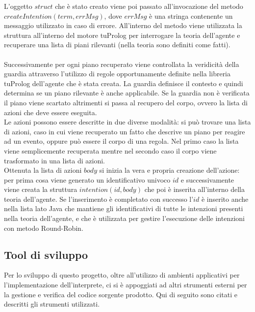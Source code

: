 L'oggetto $struct$ che è stato creato viene poi passato all'invocazione del metodo $createIntention(term, errMsg)$, dove $errMsg$ è una stringa contenente un messaggio utilizzato in caso di errore.
All'interno del metodo viene utilizzata la struttura all'interno del motore tuProlog per interrogare la teoria dell'agente e recuperare una lista di piani rilevanti (nella teoria sono definiti come fatti). \\
\\
Successivamente per ogni piano recuperato viene controllata la veridicità della guardia attraverso l'utilizzo di regole opportunamente definite nella libreria tuProlog dell'agente che è stata creata. La guardia definisce il contesto e quindi determina se un piano rilevante è anche applicabile.
Se la guardia non è verificata il piano viene scartato altrimenti si passa al recupero del corpo, ovvero la lista di azioni che deve essere eseguita.
\\
Le azioni possono essere descritte in due diverse modalità: si può trovare una lista di azioni, caso in cui viene recuperato un fatto che descrive un piano per reagire ad un evento, oppure può essere il corpo di una regola. Nel primo caso la lista viene semplicemente recuperata mentre nel secondo caso il corpo viene trasformato in una lista di azioni.
\\
Ottenuta la lista di azioni $body$ si inizia la vera e propria creazione dell'azione: per prima cosa viene generato un identificativo univoco $id$ e successivamente viene creata la struttura $intention(id,body)$ che poi è inserita all'interno della teoria dell'agente. Se l'inserimento è completato con successo l'$id$ è inserito anche nella lista lato Java che mantiene gli identificativi di tutte le intenzioni presenti nella teoria dell'agente, e che è utilizzata per gestire l'esecuzione delle intenzioni con metodo Round-Robin.


\subsection{Tool di sviluppo}
Per lo sviluppo di questo progetto, oltre all'utilizzo di ambienti applicativi per l'implementazione dell'interprete, ci si è appoggiati ad altri strumenti esterni per la gestione e verifica del codice sorgente prodotto. Qui di seguito sono citati e descritti gli strumenti utilizzati.

